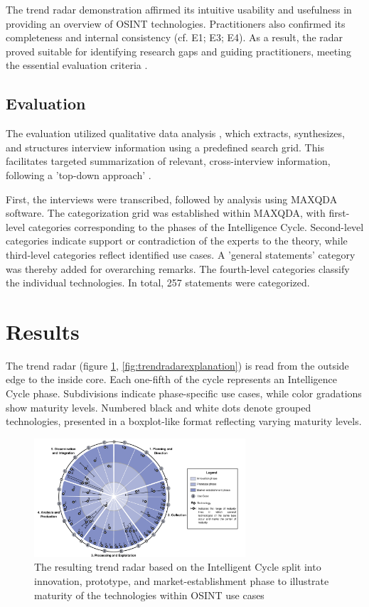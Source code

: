 \documentclass[10pt]{article}
\begin{document}
The trend radar demonstration affirmed its intuitive usability and usefulness in providing an overview of OSINT technologies. Practitioners also confirmed its completeness and internal consistency (cf. E1; E3; E4). As a result, the radar proved suitable for identifying research gaps and guiding practitioners, meeting the essential evaluation criteria \cite{Sonnenberg.2012}.

\subsection{Evaluation} \label{sec:eval}

The evaluation utilized qualitative data analysis \cite{Glaser.2009}, which extracts, synthesizes, and structures interview information using a predefined search grid. This facilitates targeted summarization of relevant, cross-interview information, following a 'top-down approach' \cite{Bogner.2014, Glaser.2009}.

First, the interviews were transcribed, followed by analysis using MAXQDA software. The categorization grid was established within MAXQDA, with first-level categories corresponding to the phases of the Intelligence Cycle. Second-level categories indicate support or contradiction of the experts to the theory, while third-level categories reflect identified use cases. A 'general statements' category was thereby added for overarching remarks. The fourth-level categories classify the individual technologies. In total, 257 statements were categorized.

\section{Results} \label{sec:results}

The trend radar (figure \ref{fig:trendradar}, \ref{fig:trendradarexplanation}) is read from the outside edge to the inside core.
Each one-fifth of the cycle represents an Intelligence Cycle phase. Subdivisions indicate
phase-specific use cases, while color gradations show maturity levels. Numbered black
and white dots denote grouped technologies, presented in a boxplot-like format reflecting
varying maturity levels.

\begin{figure}[thb]
    \centering
    \includegraphics[width=0.7\textwidth]{PDF/images/crop_Trendradar}
    \caption{The resulting trend radar based on the Intelligent Cycle split into innovation, prototype, and market-establishment phase to illustrate maturity of the technologies within OSINT use cases}
    \label{fig:trendradar}
\end{figure}
\end{document}

